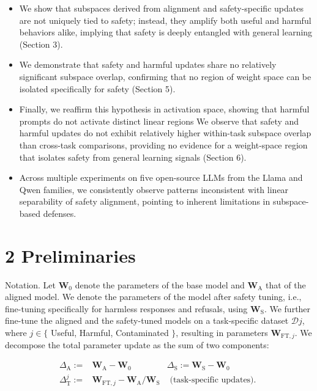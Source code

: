 \documentclass[10pt]{article}
\begin{document}
\begin{itemize}
  \item We show that subspaces derived from alignment and safety-specific updates are not uniquely tied to safety; instead, they amplify both useful and harmful behaviors alike, implying that safety is deeply entangled with general learning (Section 3).
  \item We demonstrate that safety and harmful updates share no relatively significant subspace overlap, confirming that no region of weight space can be isolated specifically for safety (Section 5).
  \item Finally, we reaffirm this hypothesis in activation space, showing that harmful prompts do not activate distinct linear regions We observe that safety and harmful updates do not exhibit relatively higher within-task subspace overlap than cross-task comparisons, providing no evidence for a weight-space region that isolates safety from general learning signals (Section 6).
  \item Across multiple experiments on five open-source LLMs from the Llama and Qwen families, we consistently observe patterns inconsistent with linear separability of safety alignment, pointing to inherent limitations in subspace-based defenses.
\end{itemize}

\section*{2 Preliminaries}
Notation. Let $\mathbf{W}_{0}$ denote the parameters of the base model and $\mathbf{W}_{\mathrm{A}}$ that of the aligned model. We denote the parameters of the model after safety tuning, i.e., fine-tuning specifically for harmless responses and refusals, using $\mathbf{W}_{\mathrm{S}}$. We further fine-tune the aligned and the safety-tuned models on a task-specific dataset $\mathcal{D} j$, where $j \in\{$ Useful, Harmful, Contaminated $\}$, resulting in parameters $\mathbf{W}_{\mathrm{FT}, j}$. We decompose the total parameter update as the sum of two components:

\[
\begin{array}{lll}
\Delta_{\mathrm{A}}:= & \mathbf{W}_{\mathrm{A}}-\mathbf{W}_{0} & \Delta_{\mathrm{S}}:=\mathbf{W}_{\mathrm{S}}-\mathbf{W}_{0} \\
\Delta_{\mathrm{T}}^{j}:= & \mathbf{W}_{\mathrm{FT}, j}-\mathbf{W}_{\mathrm{A}} / \mathbf{W}_{\mathrm{S}} & \text { (task-specific updates). } \tag{2}
\end{array}
\]
\end{document}
